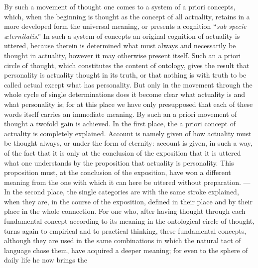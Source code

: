 \documentclass[12pt]{article}
\newcommand{\opage}[1]{\marginnote{\footnotesize\textit{[#1]}}}
\begin{document}
By such a movement of thought one comes to a system \opage{201}of a priori
concepts, which, when the beginning is thought as the concept of all actuality,
retains in a more developed form the universal meaning, or presents a cognition
``\textit{sub specie æternitatis}.'' In such a system of concepts an original
cognition of actuality is uttered, because therein is determined what must always
and necessarily be thought in actuality, however it may otherwise present itself.
Such an a priori circle of thought, which constitutes the content of ontology,
gives the result that personality is actuality thought in its truth, or that
nothing is with truth to be called actual except what has personality. But only in
the movement through the whole cycle of single determinations does it become clear
what actuality is and what personality is; for at this place we have only
presupposed that each of these words itself carries an immediate meaning. By such
an a priori movement of thought a twofold gain is achieved. In the first place,
the a priori concept of actuality is completely explained. Account is namely given
of how actuality must be thought always, or under the form of eternity: account is
given, in such a way, of the fact that it is only at the conclusion of the
exposition that it is uttered what one understands by the proposition that
actuality is personality. This proposition must, at the conclusion of the
exposition, have won a different meaning from the one with which it can here be
uttered without preparation. --- In the second place, the single categories are
with the same stroke explained, when they are, in the course of the exposition,
defined in their place and by their place in the whole connection. For one who,
after having thought through each fundamental concept according to its meaning in
the ontological circle of thought, turns again to empirical and to practical
thinking, these fundamental concepts, although they are used in the same
combinations in which the natural tact of language chose them, have acquired a
deeper meaning; for even to the sphere of daily life he now \opage{202}brings the
\end{document}
